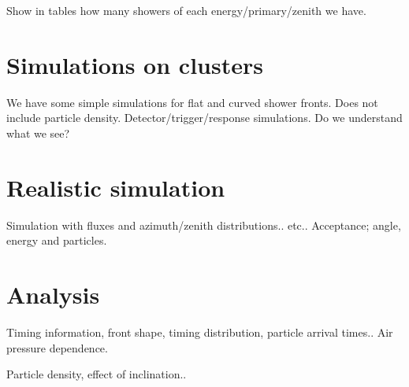 Show in tables how many showers of each energy/primary/zenith we have.


\section{Simulations on clusters}

We have some simple simulations for flat and curved shower fronts.
Does not include particle density.
Detector/trigger/response simulations. Do we understand what we see?


\section{Realistic simulation}

Simulation with fluxes and azimuth/zenith distributions..
etc..
Acceptance; angle, energy and particles.


\section{Analysis}

Timing information, front shape, timing distribution, particle arrival times..
Air pressure dependence.

Particle density, effect of inclination..
